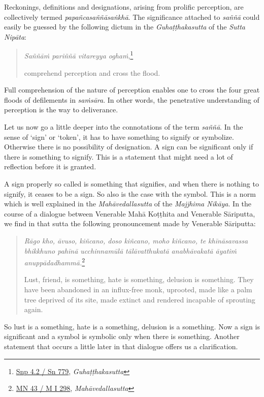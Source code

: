 Reckonings, definitions and designations, arising from prolific perception, are collectively termed \emph{papañcasaññāsaṅkhā}. The significance attached to \emph{saññā} could easily be guessed by the following dictum in the \emph{Guhaṭṭhakasutta} of the \emph{Sutta Nipāta}:

\begin{quote}
\emph{Saññāṁ pariññā vitareyya oghaṁ},\footnote{\href{https://suttacentral.net/snp4.2/pli/ms}{Snp 4.2 / Sn 779}, \emph{Guhaṭṭhakasutta}}

comprehend perception and cross the flood.
\end{quote}

Full comprehension of the nature of perception enables one to cross the four great floods of defilements in \emph{saṁsāra}. In other words, the penetrative understanding of perception is the way to deliverance.

Let us now go a little deeper into the connotations of the term \emph{saññā}. In the sense of `sign' or `token', it has to have something to signify or symbolize. Otherwise there is no possibility of designation. A sign can be significant only if there is something to signify. This is a statement that might need a lot of reflection before it is granted.

A sign properly so called is something that signifies, and when there is nothing to signify, it ceases to be a sign. So also is the case with the symbol. This is a norm which is well explained in the \emph{Mahāvedallasutta} of the \emph{Majjhima Nikāya}. In the course of a dialogue between Venerable Mahā Koṭṭhita and Venerable Sāriputta, we find in that sutta the following pronouncement made by Venerable Sāriputta:

\begin{quote}
\emph{Rāgo kho, āvuso, kiñcano, doso kiñcano, moho kiñcano, te khīnāsavassa bhikkhuno pahīnā ucchinnamūlā tālāvatthukatā anabhāvakatā āyatiṁ anuppādadhammā.}\footnote{\href{https://suttacentral.net/mn43/pli/ms}{MN 43 / M I 298}, \emph{Mahāvedallasutta}}

Lust, friend, is something, hate is something, delusion is something. They have been abandoned in an influx-free monk, uprooted, made like a palm tree deprived of its site, made extinct and rendered incapable of sprouting again.
\end{quote}

So lust is a something, hate is a something, delusion is a something. Now a sign is significant and a symbol is symbolic only when there is something. Another statement that occurs a little later in that dialogue offers us a clarification.

